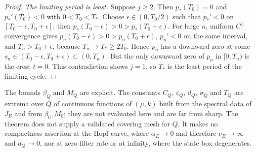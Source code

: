 \begin{proof}
\emph{The limiting period is least.} Suppose $j\ge2$. Then $p_*(T_0)=0$ and $p_*'(T_0)<0$ with $0<T_0<T_*$. Choose $\epsilon\in(0,T_0/2)$ such that $p_*'<0$ on $[T_0-\epsilon,T_0+\epsilon]$; then $p_*(T_0-\epsilon)>0>p_*(T_0+\epsilon)$. For large $n$, uniform $C^1$ convergence gives $p_n(T_0-\epsilon)>0>p_n(T_0+\epsilon)$, $p_n'<0$ on the same interval, and $T_n>T_0+\epsilon$, because $T_n\to T_*\ge2T_0$. Hence $p_n$ has a downward zero at some $s_n\in(T_0-\epsilon,T_0+\epsilon)\subset(0,T_n)$. But the only downward zero of $p_n$ in $[0,T_n)$ is the crest $t=0$. This contradiction shows $j=1$, so $T_*$ is the least period of the limiting cycle.
\end{proof}
The bounds $\beta_Q$ and $M_Q$ are explicit. The constants $C_Q$, $\varepsilon_Q$, $d_Q$, $\sigma_Q$ and $T_Q$ are extrema over $Q$ of continuous functions of $(\mu,k)$ built from the spectral data of $J_E$ and from $\beta_0,M_0$; they are not evaluated here and are far from sharp. The theorem does not supply a validated covering mesh for $Q$. It makes no compactness assertion at the Hopf curve, where $\alpha_E\to0$ and therefore $\nu_E\to\infty$ and $d_Q\to0$, nor at zero filter rate or at infinity, where the state box degenerates.
